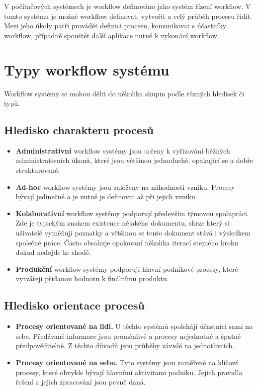 \documentclass{fithesis}
\begin{document}
V počítačových systémech je workflow definováno jako systém řízení workflow. V tomto systému je možné workflow definovat, vytvořit a celý průběh procesu řídit. Mezi jeho úkoly patří provádět definici procesu, komunikovat s účastníky workflow, případně spouštět další aplikace nutné k vykonání workflow.


\section{Typy workflow systému}
Workflow systémy se mohou dělit do několika skupin podle různých hledisek či typů. \cite{workflow}

\subsection{Hledisko charakteru procesů}
\begin{itemize}
\item \textbf{Administrativní} workflow systémy jsou určeny k vyřizování běžných administrativních úkonů, které jsou většinou jednoduché, opakující se a dobře strukturované.
\item \textbf{Ad-hoc} workflow systémy jsou založeny na náhodnosti vzniku. Procesy bývají jedinečné a je nutné je definovat až při jejich vzniku.
\item \textbf{Kolaborativní} workflow systémy podporují především týmovou spolupráci. Zde je typickým znakem existence nějakého dokumentu, skrze který si uživatelé vyměňují poznatky a většinou se tento dokument stává i výsledkem společné práce. Často obsahuje opakovaní několika iterací stejného kroku dokud nedojde ke shodě.
\item \textbf{Produkční} workflow systémy podporují hlavní podnikové procesy, které vytvářejí přidanou hodnotu k finálnímu produktu.
\end{itemize}

\subsection{Hledisko orientace procesů}
\begin{itemize}
\item \textbf{Procesy orientované na lidi.} U těchto systémů spolehájí účastníci sami na sebe. Předávané informace jsou proměnlivé a procesy nejednotné a špatně předpověditelné. Z těchto důvodů jsou průběhy závislé na jednotlivcích.
\item \textbf{Procesy orientované na sebe.} Tyto systémy jsou zaměřené na klíčové procesy, které obvykle bývají hlavními aktivitami podniku. Jejich pravidla řešení a jejich zpracování jsou pevně daná.
\end{itemize}
\end{document}
